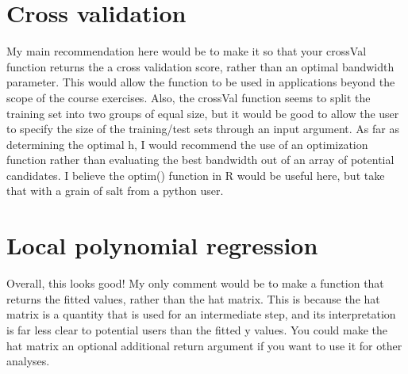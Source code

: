 \documentclass[10pt]{article}
\begin{document}
\section{Cross validation}
My main recommendation here would be to make it so that your crossVal function returns the a cross validation score, rather than an optimal bandwidth parameter. This would allow the function to be used in applications beyond the scope of the course exercises. Also, the crossVal function seems to split the training set into two groups of equal size, but it would be good to allow the user to specify the size of the training/test sets through an input argument. As far as determining the optimal h, I would recommend the use of an optimization function rather than evaluating the best bandwidth out of an array of potential candidates. I believe the optim() function in R would be useful here, but take that with a grain of salt from a python user. 

\section{Local polynomial regression}
Overall, this looks good! My only comment would be to make a function that returns the fitted values, rather than the hat matrix. This is because the hat matrix is a quantity that is used for an intermediate step, and its interpretation is far less clear to potential users than the fitted y values. You could make the hat matrix an optional additional return argument if you want to use it for other analyses. 
\end{document}
